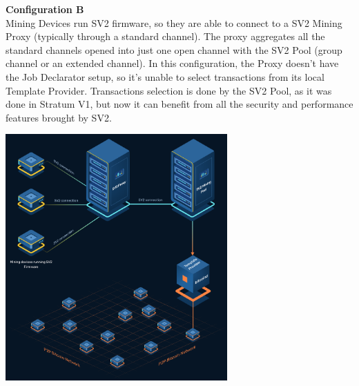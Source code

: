 \begin{itemize}
    \begin{minipage}{.40\textwidth}
    \item \textbf{Configuration B}\label{configB}\\
    Mining Devices run SV2 firmware, so they are able to connect to a SV2 Mining Proxy (typically through a standard channel). The proxy aggregates all the standard channels opened into just one open channel with the SV2 Pool (group channel or an extended channel). In this configuration, the Proxy doesn't have the Job Declarator setup, so it's unable to select transactions from its local Template Provider. Transactions selection is done by the SV2 Pool, as it was done in Stratum V1, but now it can benefit from all the security and performance features brought by SV2. 
    \end{minipage}
    \hspace{0.25cm}
    \begin{minipage}{.60\textwidth}
    \includegraphics[width=8.5cm]{Figures/sri/SRI_configB.png}
    \end{minipage}


\end{itemize}
